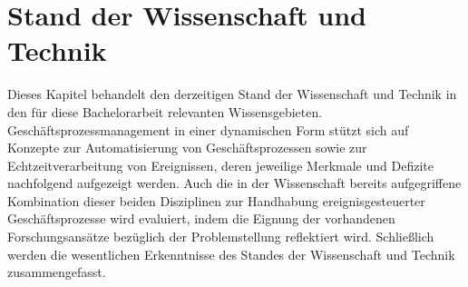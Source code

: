 \chapter{Stand der Wissenschaft und Technik}\label{ch:Grundlagen}
Dieses Kapitel behandelt den derzeitigen Stand der Wissenschaft und Technik in den für diese Bachelorarbeit relevanten Wissensgebieten. Geschäftsprozessmanagement in einer dynamischen Form stützt sich auf Konzepte zur Automatisierung von Geschäftsprozessen sowie zur Echtzeitverarbeitung von Ereignissen, deren jeweilige Merkmale und Defizite nachfolgend aufgezeigt werden.
Auch die in der Wissenschaft bereits aufgegriffene Kombination dieser beiden Disziplinen zur Handhabung ereignisgesteuerter Geschäftsprozesse wird evaluiert, indem die Eignung der vorhandenen Forschungsansätze bezüglich der Problemstellung reflektiert wird.
Schließlich werden die wesentlichen Erkenntnisse des Standes der Wissenschaft und Technik zusammengefasst.



